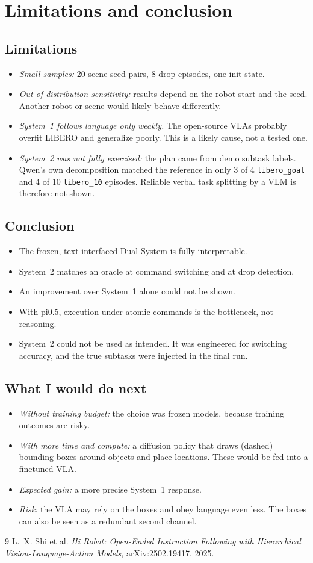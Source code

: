 \documentclass[10pt,a4paper]{article}
\begin{document}
\section{Limitations and conclusion}
\subsection{Limitations}
\begin{itemize}
\item \emph{Small samples:} 20 scene-seed pairs, 8 drop episodes, one init state.
\item \emph{Out-of-distribution sensitivity:} results depend on the robot start and the seed. Another robot or scene would likely behave differently.
\item \emph{System~1 follows language only weakly.} The open-source VLAs probably overfit LIBERO and generalize poorly. This is a likely cause, not a tested one.
\item \emph{System~2 was not fully exercised:} the plan came from demo subtask labels. Qwen's own decomposition matched the reference in only 3 of 4 \texttt{libero\_goal} and 4 of 10 \texttt{libero\_10} episodes. Reliable verbal task splitting by a VLM is therefore not shown.
\end{itemize}

\subsection{Conclusion}
\begin{itemize}
\item The frozen, text-interfaced Dual System is fully interpretable.
\item System~2 matches an oracle at command switching and at drop detection.
\item An improvement over System~1 alone could not be shown.
\item With pi0.5, execution under atomic commands is the bottleneck, not reasoning.
\item System~2 could not be used as intended. It was engineered for switching accuracy, and the true subtasks were injected in the final run.
\end{itemize}

\subsection{What I would do next}
\begin{itemize}
\item \emph{Without training budget:} the choice was frozen models, because training outcomes are risky.
\item \emph{With more time and compute:} a diffusion policy that draws (dashed) bounding boxes around objects and place locations. These would be fed into a finetuned VLA.
\item \emph{Expected gain:} a more precise System~1 response.
\item \emph{Risk:} the VLA may rely on the boxes and obey language even less. The boxes can also be seen as a redundant second channel.
\end{itemize}


\begin{thebibliography}{9}\footnotesize
{} L.~X. Shi et al. \emph{Hi Robot: Open-Ended Instruction Following with Hierarchical Vision-Language-Action Models}, arXiv:2502.19417, 2025.
\end{thebibliography}
\end{document}
